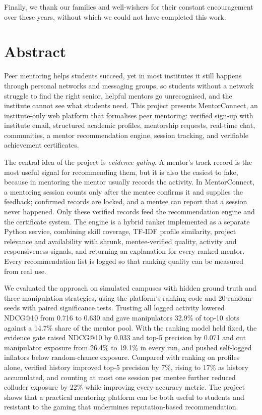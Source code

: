 \documentclass[12pt,a4paper]{report}
\begin{document}
Finally, we thank our families and well-wishers for their constant encouragement over these years, without which we could not have completed this work.

\tableofcontents
\listoffigures
\listoftables

\chapter*{Abstract}
Peer mentoring helps students succeed, yet in most institutes it still happens through personal networks and messaging groups, so students without a network struggle to find the right senior, helpful mentors go unrecognised, and the institute cannot see what students need. This project presents MentorConnect, an institute-only web platform that formalises peer mentoring: verified sign-up with institute email, structured academic profiles, mentorship requests, real-time chat, communities, a mentor recommendation engine, session tracking, and verifiable achievement certificates.

The central idea of the project is \emph{evidence gating}. A mentor's track record is the most useful signal for recommending them, but it is also the easiest to fake, because in mentoring the mentor usually records the activity. In MentorConnect, a mentoring session counts only after the mentee confirms it and supplies the feedback; confirmed records are locked, and a mentee can report that a session never happened. Only these verified records feed the recommendation engine and the certificate system. The engine is a hybrid ranker implemented as a separate Python service, combining skill coverage, TF-IDF profile similarity, project relevance and availability with shrunk, mentee-verified quality, activity and responsiveness signals, and returning an explanation for every ranked mentor. Every recommendation list is logged so that ranking quality can be measured from real use.

We evaluated the approach on simulated campuses with hidden ground truth and three manipulation strategies, using the platform's ranking code and 20 random seeds with paired significance tests. Trusting all logged activity lowered NDCG@10 from 0.716 to 0.630 and gave manipulators 32.9\% of top-10 slots against a 14.7\% share of the mentor pool. With the ranking model held fixed, the evidence gate raised NDCG@10 by 0.033 and top-5 precision by 0.071 and cut manipulator exposure from 26.4\% to 19.1\% in every run, and pushed self-logged inflators below random-chance exposure. Compared with ranking on profiles alone, verified history improved top-5 precision by 7\%, rising to 17\% as history accumulated, and counting at most one session per mentee further reduced colluder exposure by 22\% while improving every accuracy metric. The project shows that a practical mentoring platform can be both useful to students and resistant to the gaming that undermines reputation-based recommendation.
\end{document}
